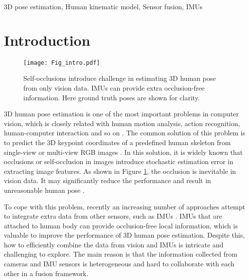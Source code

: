 \documentclass[lettersize,journal]{IEEEtran}
\begin{document}
\begin{IEEEkeywords}
3D pose estimation, Human kinematic model, Sensor fusion, IMUs
\end{IEEEkeywords}

\section{Introduction}
\label{sec:intro}

\begin{figure}[t]
 \begin{center}
 	\centerline{\texttt{[image: Fig\_intro.pdf]}}
\caption{Self-occlusions introduce challenge in estimating 3D human pose from only vision data. IMUs can provide extra occlusion-free information. Here ground truth poses are shown for clarity.}
\label{fig_intro}
\end{center}
\end{figure}

3D human pose estimation is one of the most important problems in computer vision, which is closely related with human motion analysis, action recognition, human-computer interaction and so on \cite{navaratnam2005hierarchical,yang2017learning,gao2019dual-hand,arnab2019exploiting,liu2020feature}. The common solution of this problem is to predict the 3D keypoint coordinates of a predefined human skeleton from single-view \cite{martinez2017simple} or multi-view RGB images \cite{iskakov2019learnable,qiu2019cross}. In this solution, it is widely known that occlusions or self-occlusion in images introduce stochastic estimation error in extracting image features. As shown in Figure \ref{fig_intro}, the occlusion is inevitable in vision data. It may significantly reduce the performance and result in unreasonable human pose \cite{zhang2020object,kocabas2021pare}. 

To cope with this problem, recently an increasing number of approaches attempt to integrate extra data from other sensors, such as IMUs \cite{yi2021transpose,trumble2017total}. IMUs that are attached to human body can provide occlusion-free local information, which is valuable to improve the performance of 3D human pose estimation. Despite this, how to efficiently combine the data from vision and IMUs is intricate and challenging to explore. The main reason is that the information collected from cameras and IMU sensors is heterogeneous and hard to collaborate with each other in a fusion framework. 
\end{document}
